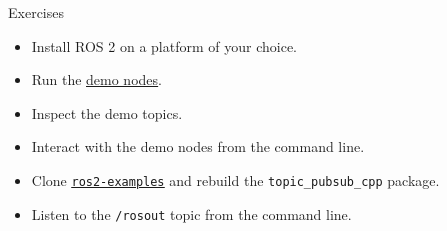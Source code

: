 \begin{frame}{Exercises}
  \begin{itemize}
    \item Install ROS 2 on a platform of your choice.
    \item Run the \href{https://docs.ros.org/en/humble/Installation/Ubuntu-Install-Debians.html\#try-some-examples}{\color{blue}\underline{demo nodes}}.
    \item Inspect the demo topics.
    \item Interact with the demo nodes from the command line.
    \item Clone \href{https://github.com/IntelligentSystemsLabUTV/ros2-examples}{\color{blue}\underline{\texttt{ros2-examples}}} and rebuild the \texttt{topic\_pubsub\_cpp} package.
    \item Listen to the \texttt{/rosout} topic from the command line.
  \end{itemize}
\end{frame}
